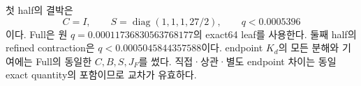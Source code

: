첫 half의 결박은
\[
C=I,\qquad S=\operatorname{diag}(1,1,1,27/2),\qquad q<0.0005396
\]
이다. Full은 원 $q=0.00011736830563768177$의 exact64 leaf를 사용한다.
둘째 half의 refined contraction은 $q<0.0005045844357588$이다.
endpoint $K_d$의 모든 분해와 기여에는 Full의 동일한 $C,B,S,J_F$를 썼다.
직접·상관·별도 endpoint 차이는 동일 exact quantity의 포함이므로 교차가 유효하다.
